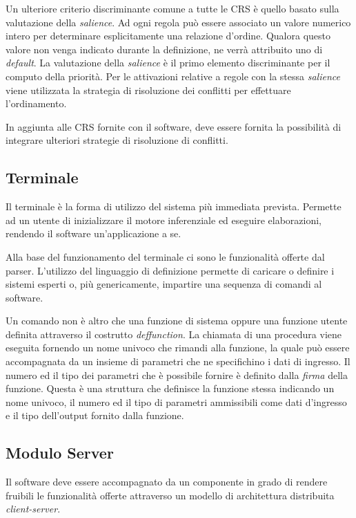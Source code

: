 Un ulteriore criterio discriminante comune a tutte le CRS è quello basato sulla valutazione della \emph{salience}. Ad ogni regola può essere associato un valore numerico intero per determinare esplicitamente una relazione d'ordine. Qualora questo valore non venga indicato durante la definizione, ne verrà attribuito uno di \emph{default}. La valutazione della \emph{salience} è il primo elemento discriminante per il computo della priorità. Per le attivazioni relative a regole con la stessa \emph{salience} viene utilizzata la strategia di risoluzione dei conflitti per effettuare l'ordinamento.

In aggiunta alle CRS fornite con il software, deve essere fornita la possibilità di integrare ulteriori strategie di risoluzione di conflitti.

\subsection{Terminale}\label{par:terminale}

Il terminale è la forma di utilizzo del sistema più immediata prevista. Permette ad un utente di inizializzare il motore inferenziale ed eseguire elaborazioni, rendendo il software un'applicazione a se. 

Alla base del funzionamento del terminale ci sono le funzionalità offerte dal parser. L'utilizzo del linguaggio di definizione permette di caricare o definire i sistemi esperti o, più genericamente, impartire una sequenza di comandi al software.

Un comando non è altro che una funzione di sistema oppure una funzione utente definita attraverso il costrutto \emph{deffunction}. La chiamata di una procedura viene eseguita fornendo un nome univoco che rimandi alla funzione, la quale può essere accompagnata da un insieme di parametri che ne specifichino i dati di ingresso. Il numero ed il tipo dei parametri che è possibile fornire è definito dalla \emph{firma} della funzione. Questa è una struttura che definisce la funzione stessa indicando un nome univoco, il numero ed il tipo di parametri ammissibili come dati d'ingresso e il tipo dell'output fornito dalla funzione.

\subsection{Modulo Server}\label{par:server}

Il software deve essere accompagnato da un componente in grado di rendere fruibili le funzionalità offerte attraverso un modello di architettura distribuita \emph{client-server}.

